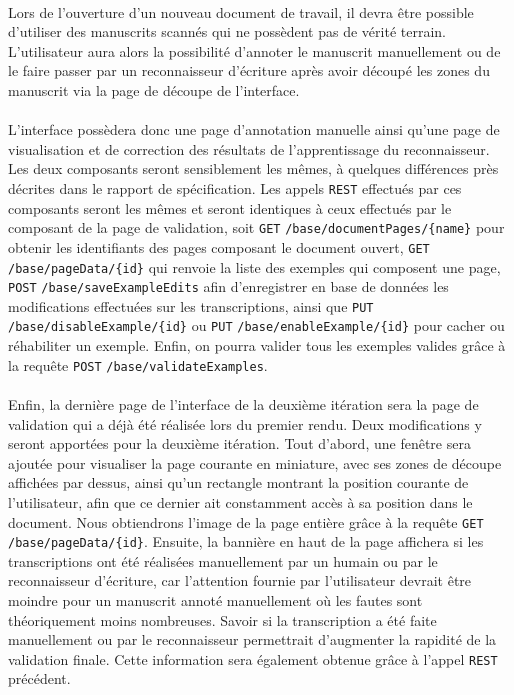 \paragraph{}
Lors de l’ouverture d’un nouveau document de travail, il devra être possible d’utiliser des manuscrits scannés qui ne possèdent pas de vérité terrain. L’utilisateur aura alors la possibilité d’annoter le manuscrit manuellement ou de le faire passer par un reconnaisseur d’écriture après avoir découpé les zones du manuscrit via la page de découpe de l’interface.

\paragraph{}
L’interface possèdera donc une page d’annotation manuelle ainsi qu'une page de visualisation et de correction des résultats de l'apprentissage du reconnaisseur. Les deux composants seront sensiblement les mêmes, à quelques différences près décrites dans le rapport de spécification.
\newline{}
Les appels \texttt{REST} effectués par ces composants seront les mêmes et seront identiques à ceux effectués par le composant de la page de validation, soit \texttt{GET} \texttt{/base/documentPages/\{name\}} pour obtenir les identifiants des pages composant le document ouvert, \texttt{GET} \texttt{/base/pageData/\{id\}} qui renvoie la liste des exemples qui composent une page, \texttt{POST} \texttt{/base/saveExampleEdits} afin d'enregistrer en base de données les modifications effectuées sur les transcriptions, ainsi que \texttt{PUT} \texttt{/base/disableExample/\{id\}} ou \texttt{PUT} \texttt{/base/enableExample/\{id\}} pour cacher ou réhabiliter un exemple. Enfin, on pourra valider tous les exemples valides grâce à la requête \texttt{POST} \texttt{/base/validateExamples}.

\paragraph{}
Enfin, la dernière page de l’interface de la deuxième itération sera la page de validation qui a déjà été réalisée lors du premier rendu. Deux modifications y seront apportées pour la deuxième itération.
\newline{}
Tout d'abord, une fenêtre sera ajoutée pour visualiser la page courante en miniature, avec ses zones de découpe affichées par dessus, ainsi qu’un rectangle montrant la position courante de l’utilisateur, afin que ce dernier ait constamment accès à sa position dans le document. Nous obtiendrons l'image de la page entière grâce à la requête \texttt{GET} \texttt{/base/pageData/\{id\}}.
\newline{}
Ensuite, la bannière en haut de la page affichera si les transcriptions ont été réalisées manuellement par un humain ou par le reconnaisseur d'écriture, car l'attention fournie par l'utilisateur devrait être moindre pour un manuscrit annoté manuellement où les fautes sont théoriquement moins nombreuses. Savoir si la transcription a été faite manuellement ou par le reconnaisseur permettrait d'augmenter la rapidité de la validation finale. Cette information sera également obtenue grâce à l'appel \texttt{REST} précédent.

